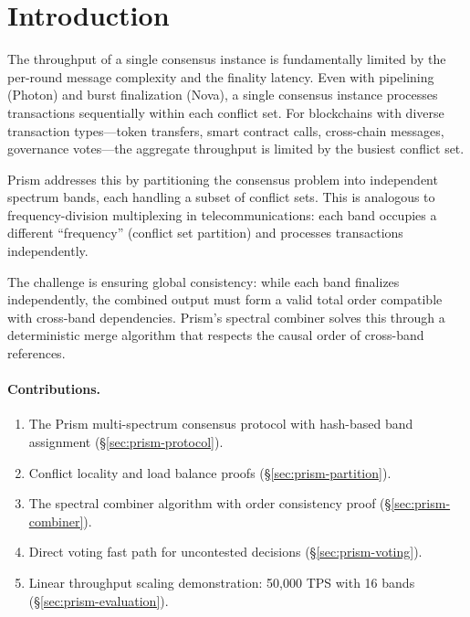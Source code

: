 \section{Introduction}

\label{sec:prism-introduction}

The throughput of a single consensus instance is fundamentally limited by the per-round
message complexity and the finality latency. Even with pipelining (Photon) and burst
finalization (Nova), a single consensus instance processes transactions sequentially
within each conflict set. For blockchains with diverse transaction types---token
transfers, smart contract calls, cross-chain messages, governance votes---the aggregate
throughput is limited by the busiest conflict set.

Prism addresses this by partitioning the consensus problem into independent spectrum
bands, each handling a subset of conflict sets. This is analogous to frequency-division
multiplexing in telecommunications: each band occupies a different ``frequency''
(conflict set partition) and processes transactions independently.

The challenge is ensuring global consistency: while each band finalizes independently,
the combined output must form a valid total order compatible with cross-band dependencies.
Prism's spectral combiner solves this through a deterministic merge algorithm that
respects the causal order of cross-band references.

\paragraph{Contributions.}
\begin{enumerate}[nosep]
\item The Prism multi-spectrum consensus protocol with hash-based band assignment (\S\ref{sec:prism-protocol}).
\item Conflict locality and load balance proofs (\S\ref{sec:prism-partition}).
\item The spectral combiner algorithm with order consistency proof (\S\ref{sec:prism-combiner}).
\item Direct voting fast path for uncontested decisions (\S\ref{sec:prism-voting}).
\item Linear throughput scaling demonstration: 50,000 TPS with 16 bands (\S\ref{sec:prism-evaluation}).
\end{enumerate}

